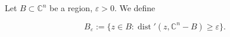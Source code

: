 Let $B \subset \mathbb{C}^n$ be a region, $\varepsilon > 0$. We define

$$B_\varepsilon := \{ z \in B : \operatorname{dist}'(z, \mathbb{C}^n - B) \geq \varepsilon \}.$$
